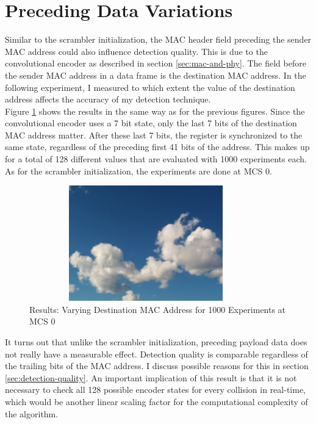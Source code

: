 
\section{Preceding Data Variations}\label{sec:ex-destination}

Similar to the scrambler initialization, the \gls{MAC} header field preceding the sender \gls{MAC} address could also influence detection quality. This is due to the convolutional encoder as described in section \ref{sec:mac-and-phy}. The field before the sender \gls{MAC} address in a data frame is the destination \gls{MAC} address. In the following experiment, I measured to which extent the value of the destination address affects the accuracy of my detection technique.\\

Figure \ref{fig:vary_dest} shows the results in the same way as for the previous figures. Since the convolutional encoder uses a 7 bit state, only the last 7 bits of the destination \gls{MAC} address matter. After these last 7 bits, the register is synchronized to the same state, regardless of the preceding first 41 bits of the address. This makes up for a total of 128 different values that are evaluated with 1000 experiments each. As for the scrambler initialization, the experiments are done at \gls{MCS} 0.

\begin{figure}[H]
	\centering
	\includegraphics[width=0.9\textwidth,height=5cm]{gfx/images/stock-clouds}
	\caption[Results: Varying Destination \gls{MAC} Address for 1000 Experiments]{Results: Varying Destination \gls{MAC} Address for 1000 Experiments at MCS 0}
	\label{fig:vary_dest}
\end{figure}

It turns out that unlike the scrambler initialization, preceding payload data does not really have a measurable effect. Detection quality is comparable regardless of the trailing bits of the \gls{MAC} address. I discuss possible reasons for this in section \ref{sec:detection-quality}. An important implication of this result is that it is not necessary to check all 128 possible encoder states for every collision in real-time, which would be another linear scaling factor for the computational complexity of the algorithm.



